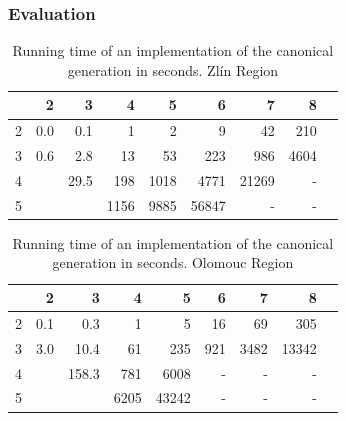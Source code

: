 \documentclass[10pt]{beamer}
\newcommand{\labelkm}{\scriptsize \diagbox[width=24pt,height=15pt]
        {\raisebox{-0pt}{k}}{ m } }
\newcommand{\evenrowcolor}{\rowcolor[gray]{0.925}}
\begin{document}
\begin{frame}
	\frametitle{Evaluation}

    \begin{table}[H]
        \caption{Running time of an implementation of the canonical
            generation in seconds. Zlín Region}
        \label{tab:runtimeZ}
        \centering
        \begin{tabular}{c|rrrrrrrr}

    \hline%
\labelkm&        2 &         3 &       4 &      5 &      6 &       7 &      8  \\[2pt]
	\hline%
     2  &      0.0 &       0.1 &       1 &      2 &      9 &     42  &  210     \\
    \evenrowcolor
     3  &      0.6 &      2.8  &     13  &     53 &   223  &    986  &  4604    \\
     4  &          &     29.5  &    198  &   1018 &   4771 &   21269 &  -       \\
    \evenrowcolor
     5  &          &           &   1156  &   9885 &  56847 &    -    & -        \\
        \end{tabular}
    \end{table}



    \begin{table}[H]
        \caption{Running time of an implementation of the canonical
            generation in seconds. Olomouc Region}
        \label{tab:runtimeO}
        \centering
        \begin{tabular}{c|rrrrrrrr}
    \hline%
\labelkm    &       2 &        3 &      4 &      5 &      6 &      7 &      8 \\[2pt]
    \hline
          2 &    0.1 &      0.3 &      1 &      5 &     16 &     69 &    305 \\
    \evenrowcolor
          3 &     3.0 &     10.4 &     61 &    235 &    921 &   3482 &  13342 \\
          4 &         &    158.3 &    781 &   6008 &     -  &      - &      - \\
    \evenrowcolor
          5 &         &          &   6205 &  43242 &     -  &      - &      - \\

        \end{tabular}
    \end{table}

\end{frame}
\end{document}

